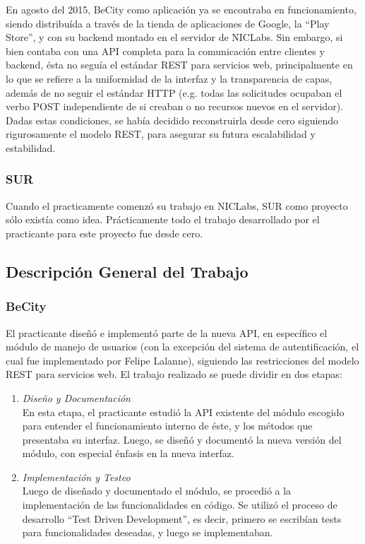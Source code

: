 \documentclass[11pt,letterpaper]{article}
\begin{document}
En agosto del 2015, BeCity como aplicación ya se encontraba en funcionamiento, siendo distribuída a través de la tienda de aplicaciones de Google, la ``Play Store'', y con su backend montado en el servidor de NICLabs. Sin embargo, si bien contaba con una API completa para la comunicación entre clientes y backend, ésta no seguía el estándar REST para servicios web, principalmente en lo que se refiere a la uniformidad de la interfaz y la transparencia de capas, además de no seguir el estándar HTTP (e.g. todas las solicitudes ocupaban el verbo POST independiente de si creaban o no recursos nuevos en el servidor). Dadas estas condiciones, se había decidido reconstruirla desde cero siguiendo rigurosamente el modelo REST, para asegurar su futura escalabilidad y estabilidad.

\subsubsection{SUR}

Cuando el practicamente comenzó su trabajo en NICLabs, SUR como proyecto sólo existía como idea. Prácticamente todo el trabajo desarrollado por el practicante para este proyecto fue desde cero.

\pagebreak
\subsection{Descripción General del Trabajo}

\subsubsection{BeCity}

El practicante diseñó e implementó parte de la nueva API, en específico el módulo de manejo de usuarios (con la excepción del sistema de autentificación, el cual fue implementado por Felipe Lalanne), siguiendo las restricciones del modelo REST para servicios web. El trabajo realizado se puede dividir en dos etapas:
\begin{enumerate}
    \item \emph{Diseño y Documentación} \\ En esta etapa, el practicante estudió la API existente del módulo escogido para entender el funcionamiento interno de éste, y los métodos que presentaba su interfaz. Luego, se diseñó y documentó la nueva versión del módulo, con especial énfasis en la nueva interfaz.
    \item \emph{Implementación y Testeo} \\ Luego de diseñado y documentado el módulo, se procedió a la implementación de las funcionalidades en código. Se utilizó el proceso de desarrollo ``Test Driven Development'', es decir, primero se escribían tests para funcionalidades deseadas, y luego se implementaban.
\end{enumerate}
\end{document}
